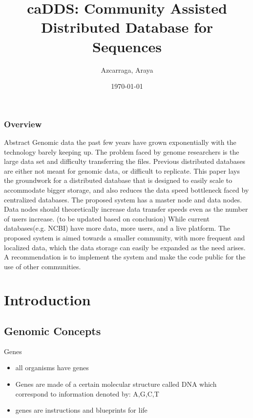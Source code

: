 \documentclass{beamer}
\title[caDDS]{caDDS: Community Assisted Distributed Database for Sequences}
\author{Azcarraga, Araya} %
\institute[Department of Computer Science, University of the Philippine - Diliman] %
{
University of the Philippine - Diliman\\ %
\medskip
}
\date{\today} %
\begin{document}
\begin{frame}
\titlepage %
\end{frame}


\begin{frame}
\frametitle{Overview} %
\tableofcontents %
\end{frame}

\begin{frame}{Abstract}
  Genomic data the past few years have grown exponentially with the technology barely keeping up. The problem faced by genome researchers is the large data set and difficulty transferring the files. Previous distributed databases are either not meant for genomic data, or difficult to replicate. This paper lays the groundwork for a distributed database that is designed to easily scale to accommodate bigger storage, and also reduces the data speed bottleneck faced by centralized databases. The proposed system has a master node and data nodes. Data nodes should theoretically increase data transfer speeds even as the number of users increase. (to be updated based on conclusion) While current databases(e.g. NCBI) have more data, more users, and a live platform. The proposed system is aimed towards a smaller community, with more frequent and localized data, which the data storage can easily be expanded as the need arises. A recommendation is to implement the system and make the code public for the use of other communities.
\end{frame}
\section{Introduction}
\subsection{Genomic Concepts}
\begin{frame}{Genes}
  \begin{itemize}   
    \item all organisms have genes
    \item Genes are made of a certain molecular structure called DNA which correspond to information denoted by: A,G,C,T
    \item genes are instructions and blueprints for life
\end{itemize}
\end{frame}
\end{document}
